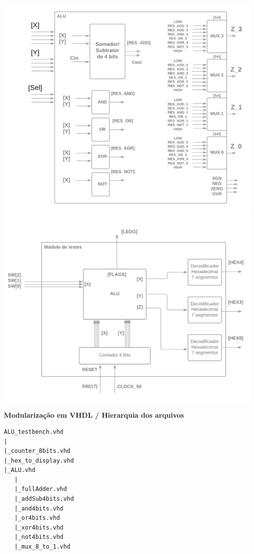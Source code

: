 \documentclass{article}
\begin{document}
\begin{center}
\includegraphics[width=\textwidth]{img/DB_ALU.png}
\includegraphics[width=\textwidth]{img/DB_Teste.png}
\end{center}

\textbf{Modularização em VHDL / Hierarquia dos arquivos}

\begin{verbatim}
ALU_testbench.vhd
|
|_counter_8bits.vhd
|_hex_to_display.vhd
|_ALU.vhd
   |
   |_fullAdder.vhd
   |_addSub4bits.vhd
   |_and4bits.vhd
   |_or4bits.vhd
   |_xor4bits.vhd
   |_not4bits.vhd
   |_mux_8_to_1.vhd

\end{verbatim}
\end{document}
